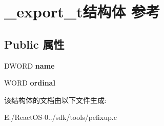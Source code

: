 \hypertarget{struct__export__t}{}\section{\+\_\+export\+\_\+t结构体 参考}
\label{struct__export__t}
\subsection*{Public 属性}
\begin{DoxyCompactItemize}
\item 
\mbox{\label{struct__export__t_a0e2ff5db657c28407e21c2668559684e}} 
D\+W\+O\+RD {\bfseries name}
\item 
\mbox{\label{struct__export__t_a76dd24d59547ac5704d68cfd0b930297}} 
W\+O\+RD {\bfseries ordinal}
\end{DoxyCompactItemize}


该结构体的文档由以下文件生成\+:\begin{DoxyCompactItemize}
\item 
E\+:/\+React\+O\+S-\/0../sdk/tools/pefixup.\+c\end{DoxyCompactItemize}
